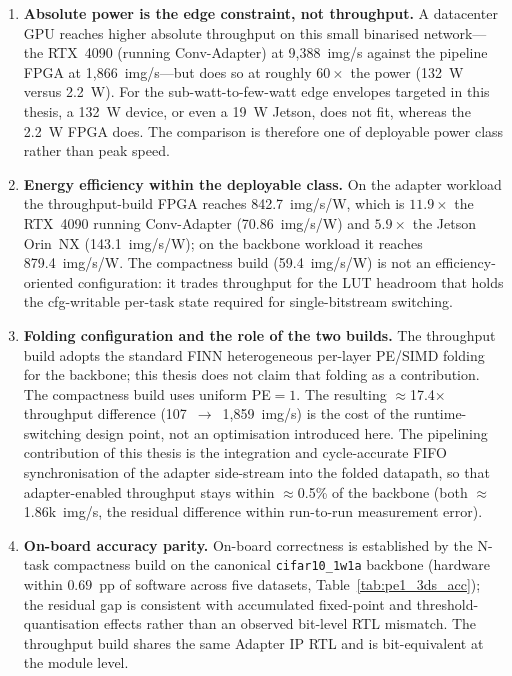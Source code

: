\documentclass[12pt, a4paper]{report}
\numberwithin{equation}{chapter}
\numberwithin{figure}{chapter}
\numberwithin{table}{chapter}
\numberwithin{algorithm}{chapter}
\begin{document}
\begin{enumerate}
    \item \textbf{Absolute power is the edge constraint, not throughput.} A datacenter GPU reaches higher absolute throughput on this small binarised network---the RTX~4090 (running Conv-Adapter) at 9{,}388~img/s against the pipeline FPGA at 1{,}866~img/s---but does so at roughly $60\times$ the power (132~W versus 2.2~W). For the sub-watt-to-few-watt edge envelopes targeted in this thesis, a 132~W device, or even a 19~W Jetson, does not fit, whereas the 2.2~W FPGA does. The comparison is therefore one of deployable power class rather than peak speed.

    \item \textbf{Energy efficiency within the deployable class.} On the adapter workload the throughput-build FPGA reaches 842.7~img/s/W, which is $11.9\times$ the RTX~4090 running Conv-Adapter (70.86~img/s/W) and $5.9\times$ the Jetson Orin~NX (143.1~img/s/W); on the backbone workload it reaches 879.4~img/s/W. The compactness build (59.4~img/s/W) is not an efficiency-oriented configuration: it trades throughput for the LUT headroom that holds the cfg-writable per-task state required for single-bitstream switching.

    \item \textbf{Folding configuration and the role of the two builds.} The throughput build adopts the standard FINN heterogeneous per-layer PE/SIMD folding~\cite{Umuroglu2017FINN, Blott2018FINNR} for the backbone; this thesis does not claim that folding as a contribution. The compactness build uses uniform PE${=}1$. The resulting $\approx$17.4$\times$ throughput difference (107~$\to$~1{,}859~img/s) is the cost of the runtime-switching design point, not an optimisation introduced here. The pipelining contribution of this thesis is the integration and cycle-accurate FIFO synchronisation of the adapter side-stream into the folded datapath, so that adapter-enabled throughput stays within $\approx$0.5\% of the backbone (both $\approx$1.86k~img/s, the residual difference within run-to-run measurement error).

    \item \textbf{On-board accuracy parity.} On-board correctness is established by the N-task compactness build on the canonical \texttt{cifar10\_1w1a} backbone (hardware within $0.69$~pp of software across five datasets, Table~\ref{tab:pe1_3ds_acc}); the residual gap is consistent with accumulated fixed-point and threshold-quantisation effects rather than an observed bit-level RTL mismatch. The throughput build shares the same Adapter IP RTL and is bit-equivalent at the module level.
\end{enumerate}
\end{document}
